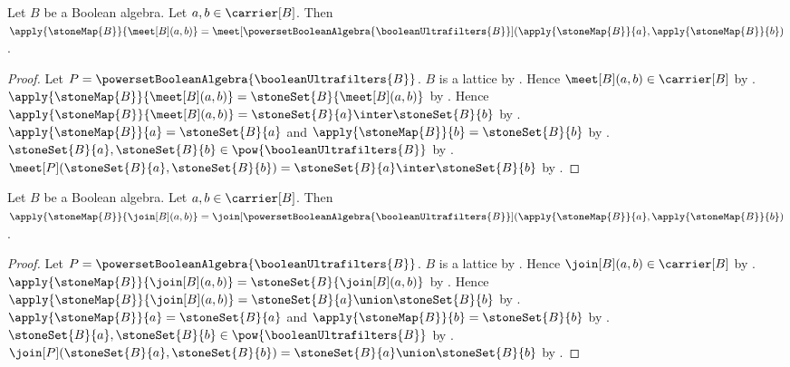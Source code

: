 \begin{proposition}\label{stone_map_meet}
    Let $B$ be a Boolean algebra.
    Let $a,b\in\carrier[B]$.
    Then $\apply{\stoneMap{B}}{\meet[B](a,b)}=
        \meet[\powersetBooleanAlgebra{\booleanUltrafilters{B}}]
            (\apply{\stoneMap{B}}{a},\apply{\stoneMap{B}}{b})$.
\end{proposition}
\begin{proof}
    Let $P=\powersetBooleanAlgebra{\booleanUltrafilters{B}}$.
    $B$ is a lattice by
        .
    Hence $\meet[B](a,b)\in\carrier[B]$ by
        .
    $\apply{\stoneMap{B}}{\meet[B](a,b)}=
        \stoneSet{B}{\meet[B](a,b)}$ by .
    Hence $\apply{\stoneMap{B}}{\meet[B](a,b)}=
        \stoneSet{B}{a}\inter\stoneSet{B}{b}$ by
        .
    $\apply{\stoneMap{B}}{a}=\stoneSet{B}{a}$ and
        $\apply{\stoneMap{B}}{b}=\stoneSet{B}{b}$ by
        .
    $\stoneSet{B}{a},\stoneSet{B}{b}
        \in\pow{\booleanUltrafilters{B}}$ by
        .
    $\meet[P](\stoneSet{B}{a},\stoneSet{B}{b})=
        \stoneSet{B}{a}\inter\stoneSet{B}{b}$ by
        .
\end{proof}

\begin{proposition}\label{stone_map_join}
    Let $B$ be a Boolean algebra.
    Let $a,b\in\carrier[B]$.
    Then $\apply{\stoneMap{B}}{\join[B](a,b)}=
        \join[\powersetBooleanAlgebra{\booleanUltrafilters{B}}]
            (\apply{\stoneMap{B}}{a},\apply{\stoneMap{B}}{b})$.
\end{proposition}
\begin{proof}
    Let $P=\powersetBooleanAlgebra{\booleanUltrafilters{B}}$.
    $B$ is a lattice by
        .
    Hence $\join[B](a,b)\in\carrier[B]$ by
        .
    $\apply{\stoneMap{B}}{\join[B](a,b)}=
        \stoneSet{B}{\join[B](a,b)}$ by .
    Hence $\apply{\stoneMap{B}}{\join[B](a,b)}=
        \stoneSet{B}{a}\union\stoneSet{B}{b}$ by
        .
    $\apply{\stoneMap{B}}{a}=\stoneSet{B}{a}$ and
        $\apply{\stoneMap{B}}{b}=\stoneSet{B}{b}$ by
        .
    $\stoneSet{B}{a},\stoneSet{B}{b}
        \in\pow{\booleanUltrafilters{B}}$ by
        .
    $\join[P](\stoneSet{B}{a},\stoneSet{B}{b})=
        \stoneSet{B}{a}\union\stoneSet{B}{b}$ by
        .
\end{proof}

